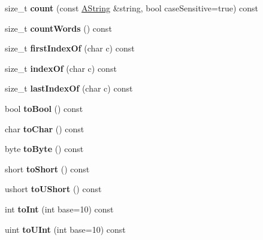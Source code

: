 \begin{DoxyCompactItemize}
\mbox{\label{class_a_string_a24d7963315d80af76af246970f8c19dd}} 
size\+\_\+t {\bfseries count} (const \mbox{\hyperlink{class_a_string}{A\+String}} \&string, bool case\+Sensitive=true) const
\item 
\mbox{\label{class_a_string_aed6d37a9b7bfd2dee2d50c37401a1dad}} 
size\+\_\+t {\bfseries count\+Words} () const
\item 
\mbox{\label{class_a_string_a8b92a3ca206d9a1a091c8e0609d39c0b}} 
size\+\_\+t {\bfseries first\+Index\+Of} (char c) const
\item 
\mbox{\label{class_a_string_a28ba997ce8f0acc4d05cc567bdfce6d0}} 
size\+\_\+t {\bfseries index\+Of} (char c) const
\item 
\mbox{\label{class_a_string_a11458abb719f576874995cc1a1e06078}} 
size\+\_\+t {\bfseries last\+Index\+Of} (char c) const
\item 
\mbox{\label{class_a_string_addea3a08682e1875b48d679f30f539cb}} 
bool {\bfseries to\+Bool} () const
\item 
\mbox{\label{class_a_string_a6cb34c26433abd7e75e0bdf9bb40ccba}} 
char {\bfseries to\+Char} () const
\item 
\mbox{\label{class_a_string_a67f811fea214d958fe296fef79776bc1}} 
byte {\bfseries to\+Byte} () const
\item 
\mbox{\label{class_a_string_a57ad542374eaadedfd9bcc4789887d79}} 
short {\bfseries to\+Short} () const
\item 
\mbox{\label{class_a_string_a4540c5503000d2f399617920055de7a4}} 
ushort {\bfseries to\+U\+Short} () const
\item 
\mbox{\label{class_a_string_a037e4cedecdb1d68614cf3f199f85834}} 
int {\bfseries to\+Int} (int base=10) const
\item 
\mbox{\label{class_a_string_ad674ff871fa6106dc82f3e03acec3639}} 
uint {\bfseries to\+U\+Int} (int base=10) const

\end{DoxyCompactItemize}
